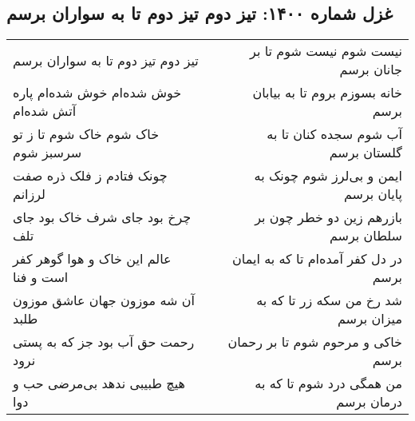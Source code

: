 \begin{center}
\section*{غزل شماره ۱۴۰۰: تیز دوم تیز دوم تا به سواران برسم}
\label{sec:1400}
\begin{longtable}{l p{0.5cm} r}
تیز دوم تیز دوم تا به سواران برسم
&&
نیست شوم نیست شوم تا بر جانان برسم
\\
خوش شده‌ام خوش شده‌ام پاره آتش شده‌ام
&&
خانه بسوزم بروم تا به بیابان برسم
\\
خاک شوم خاک شوم تا ز تو سرسبز شوم
&&
آب شوم سجده کنان تا به گلستان برسم
\\
چونک فتادم ز فلک ذره صفت لرزانم
&&
ایمن و بی‌لرز شوم چونک به پایان برسم
\\
چرخ بود جای شرف خاک بود جای تلف
&&
بازرهم زین دو خطر چون بر سلطان برسم
\\
عالم این خاک و هوا گوهر کفر است و فنا
&&
در دل کفر آمده‌ام تا که به ایمان برسم
\\
آن شه موزون جهان عاشق موزون طلبد
&&
شد رخ من سکه زر تا که به میزان برسم
\\
رحمت حق آب بود جز که به پستی نرود
&&
خاکی و مرحوم شوم تا بر رحمان برسم
\\
هیچ طبیبی ندهد بی‌مرضی حب و دوا
&&
من همگی درد شوم تا که به درمان برسم
\\
\end{longtable}
\end{center}
